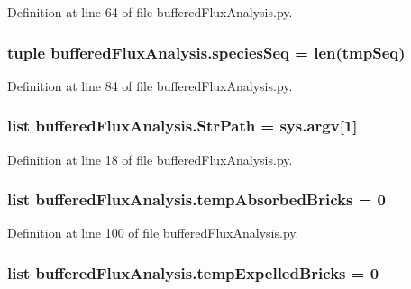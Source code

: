 Definition at line 64 of file buffered\-Flux\-Analysis.\-py.

\hypertarget{namespacebuffered_flux_analysis_a19a0d4fb7445508e6204894b5f4eca23}{
\subsubsection[{species\-Seq}]{\setlength{\rightskip}{0pt plus 5cm}tuple buffered\-Flux\-Analysis.\-species\-Seq = len(tmp\-Seq)}}\label{namespacebuffered_flux_analysis_a19a0d4fb7445508e6204894b5f4eca23}


Definition at line 84 of file buffered\-Flux\-Analysis.\-py.

\hypertarget{namespacebuffered_flux_analysis_a86b649a1e51f1e3384ad432c0de3340b}{
\subsubsection[{Str\-Path}]{\setlength{\rightskip}{0pt plus 5cm}list buffered\-Flux\-Analysis.\-Str\-Path = sys.\-argv\mbox{[}1\mbox{]}}}\label{namespacebuffered_flux_analysis_a86b649a1e51f1e3384ad432c0de3340b}


Definition at line 18 of file buffered\-Flux\-Analysis.\-py.

\hypertarget{namespacebuffered_flux_analysis_a83acfbebbbafd68ab6574c76d2be6c60}{
\subsubsection[{temp\-Absorbed\-Bricks}]{\setlength{\rightskip}{0pt plus 5cm}list buffered\-Flux\-Analysis.\-temp\-Absorbed\-Bricks = 0}}\label{namespacebuffered_flux_analysis_a83acfbebbbafd68ab6574c76d2be6c60}


Definition at line 100 of file buffered\-Flux\-Analysis.\-py.

\hypertarget{namespacebuffered_flux_analysis_a496cf2986cc324a0421c288991e1be93}{
\subsubsection[{temp\-Expelled\-Bricks}]{\setlength{\rightskip}{0pt plus 5cm}list buffered\-Flux\-Analysis.\-temp\-Expelled\-Bricks = 0}}\label{namespacebuffered_flux_analysis_a496cf2986cc324a0421c288991e1be93}



